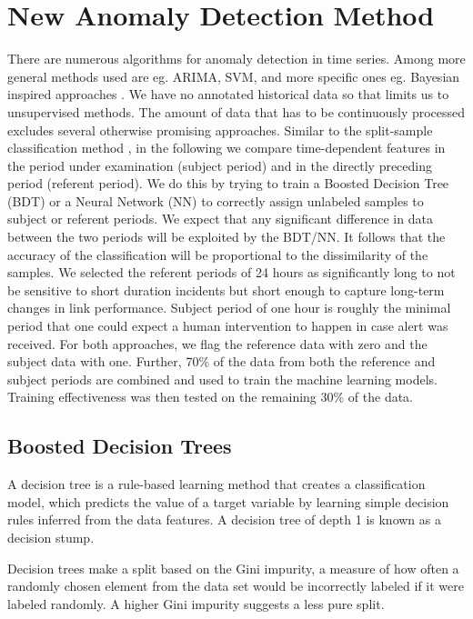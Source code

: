 \documentclass[5p]{elsarticle}
\begin{document}
\section{New Anomaly Detection Method}

There are numerous algorithms for anomaly detection in time series. Among more general methods used are eg. ARIMA, SVM, and more specific ones eg. Bayesian inspired approaches \cite{sedam}. We have no annotated historical data so that limits us to unsupervised methods. The amount of data that has to be continuously processed excludes several otherwise promising approaches. Similar to the split-sample classification method \cite{sest}, in the following we compare time-dependent features in the period under examination (subject period) and in the directly preceding period (referent period). We do this by trying to train a Boosted Decision Tree (BDT)\cite{osam} or a Neural Network (NN) to correctly assign unlabeled samples to subject or referent periods.  We expect that any significant difference in data between the two periods will be exploited by the BDT/NN. It follows that the accuracy of the classification will be proportional to the dissimilarity of the samples. We selected the referent periods of 24 hours as significantly long to not be sensitive to short duration incidents but short enough to capture long-term changes in link performance. Subject period of one hour is roughly the minimal period that one could expect a human intervention to happen in case alert was received. For both approaches, we flag the reference data with zero and the subject data with one.  Further, 70\% of the data from both the reference and subject periods are combined and used to train the machine learning models. Training effectiveness was then tested on the remaining 30\% of the data.

\subsection{Boosted Decision Trees}

A decision tree is a rule-based learning method \cite{dva} that creates a classification model, which predicts the value of a target variable by learning simple decision rules inferred from the data features. A decision tree of depth 1 is known as a decision stump.

Decision trees make a split based on the Gini impurity, a measure of how often a randomly chosen element from the data set would be incorrectly labeled if it were labeled randomly. A higher Gini impurity suggests a less pure split.
\end{document}
